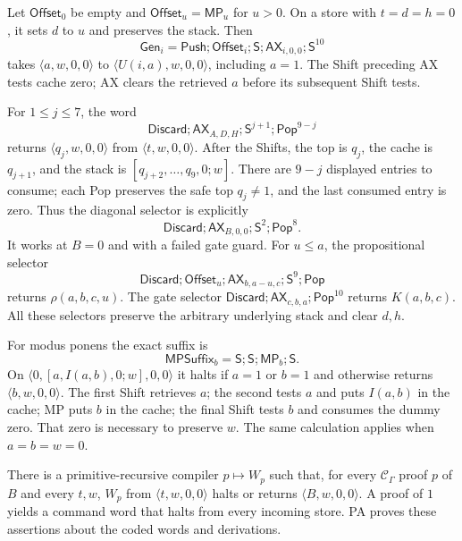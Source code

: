 Let $\mathsf{Offset}_0$ be empty and
$\mathsf{Offset}_u=\mathsf{MP}_u$ for $u>0$.  On a store with
$t=d=h=0$, it sets $d$ to $u$ and preserves the stack.  Then
\[
 \mathsf{Gen}_i=\mathsf{Push};\mathsf{Offset}_i;\mathsf S;
                  \mathsf{AX}_{i,0,0};\mathsf S^{10}
\]
takes $\langle a,w,0,0\rangle$ to
$\langle U(i,a),w,0,0\rangle$, including $a=1$.
The Shift preceding AX tests cache zero; AX clears the retrieved
$a$ before its subsequent Shift tests.

For $1\le j\le7$, the word
\[
 \mathsf{Discard};\mathsf{AX}_{A,D,H};\mathsf S^{j+1};
                              \mathsf{Pop}^{9-j}
\]
returns $\langle q_j,w,0,0\rangle$ from
$\langle t,w,0,0\rangle$.  After the Shifts, the top is $q_j$,
the cache is $q_{j+1}$, and the stack is
$[q_{j+2},\ldots,q_9,0;w]$.  There are $9-j$ displayed entries to
consume; each Pop preserves the safe top $q_j\ne1$, and the last
consumed entry is zero.  Thus the diagonal selector is explicitly
\[
 \mathsf{Discard};\mathsf{AX}_{B,0,0};\mathsf S^2;\mathsf{Pop}^{8}.
\]
It works at $B=0$ and with a failed gate guard.  For $u\le a$, the
propositional selector
\[
 \mathsf{Discard};\mathsf{Offset}_u;
 \mathsf{AX}_{b,a-u,c};\mathsf S^9;\mathsf{Pop}
\]
returns $\rho(a,b,c,u)$.  The gate selector
$\mathsf{Discard};\mathsf{AX}_{c,b,a};\mathsf{Pop}^{10}$ returns
$K(a,b,c)$.  All these selectors preserve the arbitrary underlying
stack and clear $d,h$.

For modus ponens the exact suffix is
\[
 \mathsf{MPSuffix}_b=\mathsf S;\mathsf S;\mathsf{MP}_b;\mathsf S.
\]
On $\langle0,[a,I(a,b),0;w],0,0\rangle$ it halts if $a=1$ or
$b=1$ and otherwise returns $\langle b,w,0,0\rangle$.
The first Shift retrieves $a$; the second tests $a$ and puts
$I(a,b)$ in the cache; MP puts $b$ in the cache; the final Shift
tests $b$ and consumes the dummy zero.  That zero is necessary to
preserve $w$.  The same calculation applies when $a=b=w=0$.

\begin{lemma}
\label{cal:word-lemma}
There is a primitive-recursive compiler $p\mapsto W_p$ such that,
for every $\mathcal C_\Gamma$ proof $p$ of $B$ and every $t,w$,
$W_p$ from $\langle t,w,0,0\rangle$ halts or returns
$\langle B,w,0,0\rangle$.  A proof of $1$ yields a command word
that halts from every incoming store.  PA proves these assertions
about the coded words and derivations.
\end{lemma}

